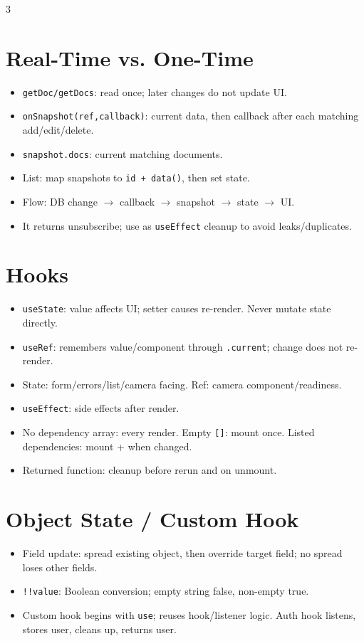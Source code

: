 \documentclass[10pt,a4paper]{article}
\begin{document}
\begin{multicols}{3}
\section*{Real-Time vs. One-Time}
\begin{itemize}
  \item \texttt{getDoc/getDocs}: read once; later changes do not update UI.
  \item \texttt{onSnapshot(ref,callback)}: current data, then callback after each matching add/edit/delete.
  \item \texttt{snapshot.docs}: current matching documents.
  \item List: map snapshots to \texttt{id + data()}, then set state.
  \item Flow: DB change $\rightarrow$ callback $\rightarrow$ snapshot $\rightarrow$ state $\rightarrow$ UI.
  \item It returns unsubscribe; use as \texttt{useEffect} cleanup to avoid leaks/duplicates.
\end{itemize}

\section*{Hooks}
\begin{itemize}
  \item \texttt{useState}: value affects UI; setter causes re-render. Never mutate state directly.
  \item \texttt{useRef}: remembers value/component through \texttt{.current}; change does not re-render.
  \item State: form/errors/list/camera facing. Ref: camera component/readiness.
  \item \texttt{useEffect}: side effects after render.
  \item No dependency array: every render. Empty \texttt{[]}: mount once. Listed dependencies: mount + when changed.
  \item Returned function: cleanup before rerun and on unmount.
\end{itemize}

\section*{Object State / Custom Hook}
\begin{itemize}
  \item Field update: spread existing object, then override target field; no spread loses other fields.
  \item \texttt{!!value}: Boolean conversion; empty string false, non-empty true.
  \item Custom hook begins with \texttt{use}; reuses hook/listener logic. Auth hook listens, stores user, cleans up, returns user.
\end{itemize}


\end{multicols}
\end{document}
